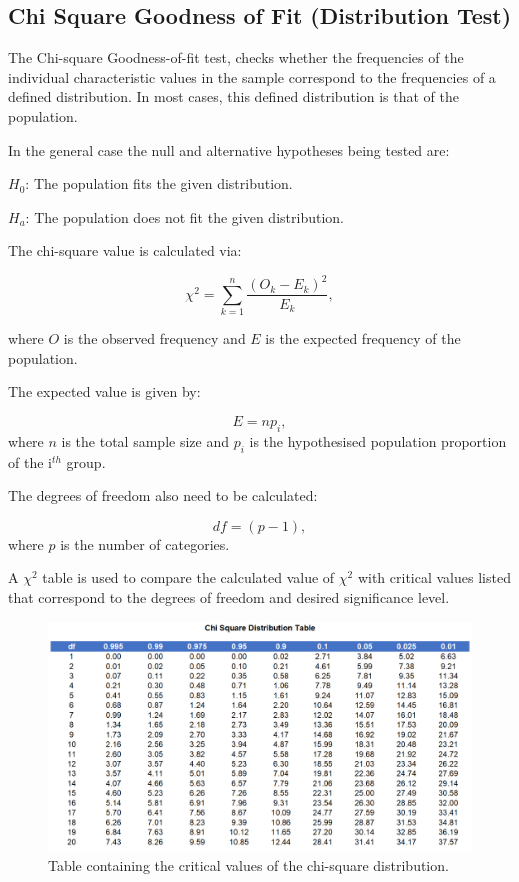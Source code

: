 \documentclass[
]{book}
\begin{document}
\hypertarget{chi-square-goodness-of-fit-distribution-test}{%
\subsection{Chi Square Goodness of Fit (Distribution Test)}\label{chi-square-goodness-of-fit-distribution-test}}

The Chi-square Goodness-of-fit test, checks whether the frequencies of the individual characteristic values in the sample correspond to the frequencies of a defined distribution. In most cases, this defined distribution is that of the population.

In the general case the null and alternative hypotheses being tested are:

\(H_0\): The population fits the given distribution.

\(H_a\): The population does not fit the given distribution.

The chi-square value is calculated via:

\[\chi^2=\sum_{k=1}^{n}\frac{(O_k-E_k)^2}{E_k},\]

where \(O\) is the observed frequency and \(E\) is the expected frequency of the population.

The expected value is given by:

\[E=np_i,\]
where \(n\) is the total sample size and \(p_i\) is the hypothesised population proportion of the i\(^{th}\) group.

The degrees of freedom also need to be calculated:

\[df=(p-1),\]
where \(p\) is the number of categories.

A \(\chi^2\) table is used to compare the calculated value of \(\chi^2\) with critical values listed that correspond to the degrees of freedom and desired significance level.

\begin{figure}
\centering
\includegraphics{chisquare.png}
\caption{Table containing the critical values of the chi-square distribution.}
\end{figure}
\end{document}
